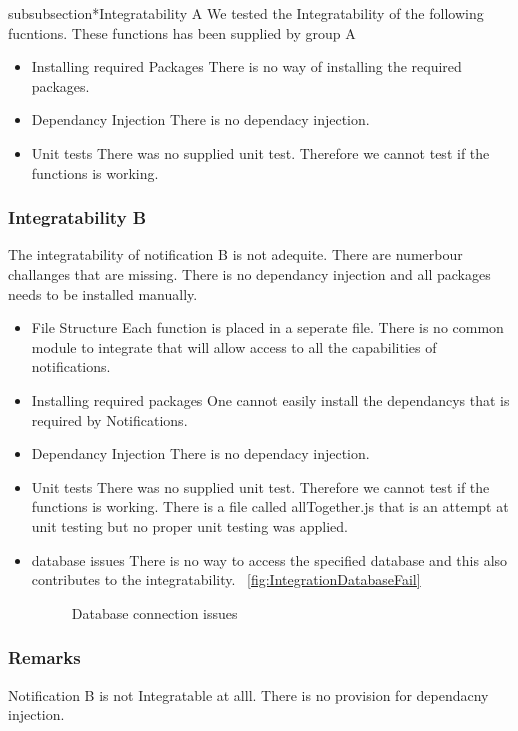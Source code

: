 subsubsection*{Integratability A}
We tested the Integratability of the following fucntions. These functions has been supplied by group A
\begin{itemize}
	\item Installing required Packages
	There is no way of installing the required packages.
	\item Dependancy Injection
	There is no dependacy injection.
	\item Unit tests
	There was no supplied unit test. Therefore we cannot test if the functions is working.
\end{itemize}
\subsubsection*{Integratability B}
The integratability of notification B is not adequite. There are numerbour challanges that are missing. There is no dependancy injection and all packages needs to be installed manually.
\begin{itemize}
	\item File Structure 
	Each function is placed in a seperate file. There is no common module to integrate that will allow access to all the capabilities of notifications.
	\item Installing required packages
	One cannot easily install the dependancys that is required by Notifications.
	\item Dependancy Injection
	There is no dependacy injection.
	\item Unit tests
	There was no supplied unit test. Therefore we cannot test if the functions is working. There is a file called allTogether.js that is an attempt at unit testing but no proper unit testing was applied.
	\item database issues
	There is no way to access the specified database and this also contributes to the integratability. 
~\ref{fig:IntegrationDatabaseFail}
\begin{figure}[H]
	\centering
	\caption{Database connection issues}
	\label{fig:scope}
\end{figure}
\end{itemize}
\subsubsection*{Remarks}
Notification B is not Integratable at alll. There is no provision for dependacny injection.